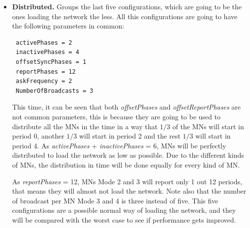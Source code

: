 \begin{itemize}
From this group, and attending to the number of \acp{MN} of each Mode (see Figure \ref{fig:ProtocolPhases}) this 5 configurations are proposed:
\begin{itemize}
 \item[-] \textbf{Config 1}: 15 \acp{MN} Mode 1, 15 \acp{MN} Mode 2, 15 \acp{MN} Mode 3 and 15 \acp{MN} Mode 4.
 \item[-] \textbf{Config 2}: 6 \acp{MN} Mode 1, 6 \acp{MN} Mode 2, 15 \acp{MN} Mode 3 and 33 \acp{MN} Mode 4.
 \item[-] \textbf{Config 3}: 6 \acp{MN} Mode 1, 6 \acp{MN} Mode 2, 33 \acp{MN} Mode 3 and 15 \acp{MN} Mode 4.
 \item[-] \textbf{Config 4}: 33 \acp{MN} Mode 1, 15 \acp{MN} Mode 2, 6 \acp{MN} Mode 3 and 6 \acp{MN} Mode 4.
 \item[-] \textbf{Config 5}: 15 \acp{MN} Mode 1, 33 \acp{MN} Mode 2, 6 \acp{MN} Mode 3 and 6 \acp{MN} Mode 4.
\end{itemize}
 \item \textbf{Distributed. }Groups the last five configurations, which are going to be the ones loading the network the less. All this
configurations are going to have the following parameters in common:
\begin{verbatim}
 activePhases = 2
 inactivePhases = 4
 offsetSyncPhases = 1
 reportPhases = 12
 askFrequency = 2
 NumberOfBroadcasts = 3
\end{verbatim}
This time, it can be seen that both \textit{offsetPhases} and \textit{offsetReportPhases} are not common parameters, this is because they are going to be
used to distribute all the \acp{MN} in the time in a way that $1/3$ of the \acp{MN} will start in period 0, another $1/3$ will start in period 2 and the 
rest $1/3$ will start in period 4. As \textit{activePhases} + \textit{inactivePhases} = 6, \acp{MN} will be perfectly distributed to load the network as 
low as possible. Due to the different kinds of \acp{MN}, the distribution in time will be done equally for every kind of \ac{MN}.

As \textit{reportPhases} = 12, \acp{MN} Mode 2 and 3 will report only 1 out 12 periods, that means they will almost not load the network. Note also that 
the number of broadcast per \ac{MN} Mode 3 and 4 is three instead of five. This five configurations are a possible normal way of loading the network, and
they will be compared with the worst case to see if performance gets improved.


\end{itemize}
